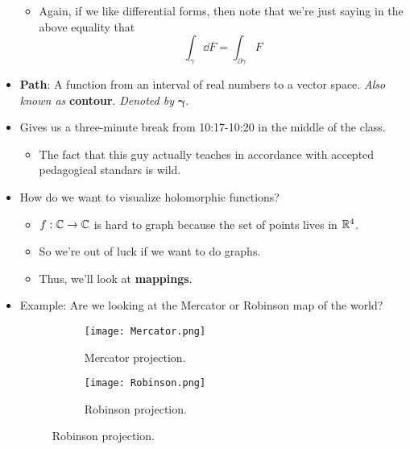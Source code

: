 \documentclass[../notes.tex]{subfiles}
\begin{document}
\begin{itemize}
    \begin{itemize}
        \item Again, if we like differential forms, then note that we're just saying in the above equality that
        \begin{equation*}
            \int_\gamma\dd{F} = \int_{\partial\gamma}F
        \end{equation*}
    \end{itemize}
    \item \textbf{Path}: A function from an interval of real numbers to a vector space. \emph{Also known as} \textbf{contour}. \emph{Denoted by} $\bm{\gamma}$.
    \item Gives us a three-minute break from 10:17-10:20 in the middle of the class.
    \begin{itemize}
        \item The fact that this guy actually teaches in accordance with accepted pedagogical standars is wild.
    \end{itemize}
    \item How do we want to visualize holomorphic functions?
    \begin{itemize}
        \item $f:\mathbb{C}\to\mathbb{C}$ is hard to graph because the set of points lives in $\mathbb{R}^4$.
        \item So we're out of luck if we want to do graphs.
        \item Thus, we'll look at \textbf{mappings}.
    \end{itemize}
    \item Example: Are we looking at the Mercator or Robinson map of the world?
    \begin{figure}[h!]
        \centering
        \begin{subfigure}[b]{0.3\linewidth}
            \centering
            \texttt{[image: Mercator.png]}
            \caption{Mercator projection.}
            \label{fig:mappingsa}
        \end{subfigure}
        \begin{subfigure}[b]{0.3\linewidth}
            \centering
            \texttt{[image: Robinson.png]}
            \caption{Robinson projection.}
            \label{fig:mappingsb}
        \end{subfigure}

\end{figure}
\end{itemize}
\end{document}
